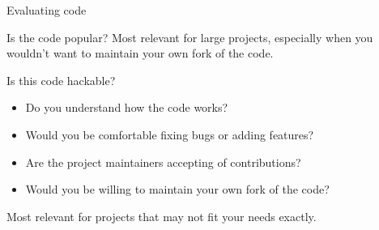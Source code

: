 \documentclass[xcolor=dvipsnames]{beamer}
\begin{document}
\begin{section}{Evaluating code}
\begin{frame}{Is the code popular?}
    \bigskip
    Most relevant for large projects, especially when you wouldn't want to maintain your own fork of the code.
  \end{frame}

  \begin{frame}{Is this code hackable?}
    \begin{itemize}
      \item Do you understand how the code works?
      \item Would you be comfortable fixing bugs or adding features?
      \item Are the project maintainers accepting of contributions?
      \item Would you be willing to maintain your own fork of the code?
    \end{itemize}

    \bigskip
    Most relevant for projects that may not fit your needs exactly.
  \end{frame}

\end{section}
\end{document}

